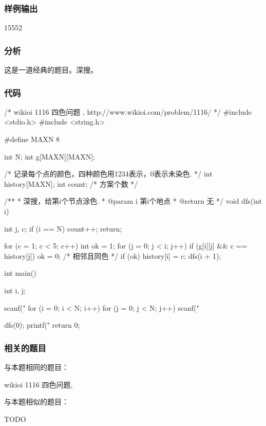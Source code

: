 \subsubsection{样例输出}
\begin{Code}
15552
\end{Code}

\subsubsection{分析}
这是一道经典的题目。深搜。

\subsubsection{代码}
\begin{Codex}[label=four_colors.c]
/* wikioi 1116 四色问题   , http://www.wikioi.com/problem/1116/ */
#include <stdio.h>
#include <string.h>

#define MAXN 8

int N;
int g[MAXN][MAXN];

/* 记录每个点的颜色，四种颜色用1234表示，0表示未染色. */
int history[MAXN];
int count; /* 方案个数 */

/**
 * 深搜，给第i个节点涂色.
 * @param i 第i个地点
 * @return 无
 */
void dfs(int i) {
    int j, c;
    if (i == N) {
        count++;
        return;
    }

    for (c = 1; c < 5; c++) {
        int ok = 1;
        for (j = 0; j < i; j++) {
            if (g[i][j] && c == history[j])
                ok = 0; /* 相邻且同色 */
        }
        if (ok) {
            history[i] = c;
            dfs(i + 1);
        }
    }
}

int main() {
    int i, j;

    scanf("%
    for (i = 0; i < N; i++) {
        for (j = 0; j < N; j++) {
            scanf("%
        }
    }

    dfs(0);
    printf("%
    return 0;
}
\end{Codex}

\subsubsection{相关的题目}
与本题相同的题目：
\begindot
\item wikioi 1116 四色问题, 
\myenddot

与本题相似的题目：
\begindot
\item TODO
\myenddot


